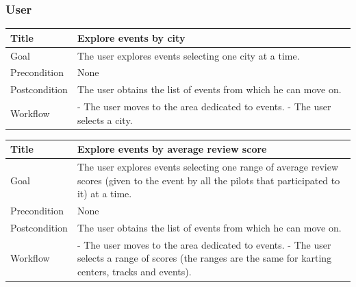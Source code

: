 \documentclass{beamer}
\begin{document}
\begin{frame}
    \frametitle{User}
    \begin{table}
        \tiny
        \begin{tabular}{|p{2cm}|p{6cm}|}
        \hline
        Title & \textbf{Explore events by city} \\
        \hline
        Goal & The user explores events selecting one city at a time. \\
        \hline
        Precondition & None \\
        \hline
        Postcondition & The user obtains the list of events from which he can move on.\\
        \hline
        Workflow &
        - The user moves to the area dedicated to events. \newline
        - The user selects a city. \\
        \hline
        \end{tabular}
\end{table}

\begin{table}
    \tiny
    \begin{tabular}{|p{2cm}|p{6cm}|}
    \hline
    Title & \textbf{Explore events by average review score} \\
    \hline
    Goal & The user explores events selecting one range of average review scores (given to the event by all the pilots
    that participated to it) at a time. \\
    \hline
    Precondition & None \\
    \hline
    Postcondition & The user obtains the list of events from which he can move on.\\
    \hline
    Workflow &
    - The user moves to the area dedicated to events. \newline
    - The user selects a range of scores (the ranges are the same for karting centers, tracks and events). \\
    \hline
    \end{tabular}
\end{table}
\end{frame}



\end{document}
